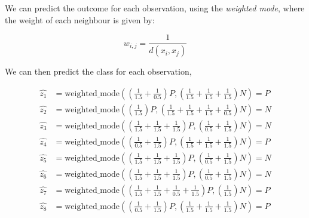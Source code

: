 \documentclass[12pt]{article}
\begin{document}
\begin{enumerate}[leftmargin=\labelsep]
          We can predict the outcome for each observation, using the \textit{weighted mode},
          where the weight of each neighbour is given by:

          $$
              w_{i,j} = \frac{1}{d(x_i, x_j)}
          $$

          We can then predict the class for each observation,

          \[
              \begin{aligned}
                  \hat{z_1} & = \text{weighted\_mode} \left(\left(\frac{1}{1.5}+\frac{1}{0.5}\right)P,\left(\frac{1}{1.5}+\frac{1}{1.5}+\frac{1}{1.5}\right)N\right) = P \\
                  \hat{z_2} & = \text{weighted\_mode} \left(\left(\frac{1}{1.5}\right)P,\left(\frac{1}{1.5}+\frac{1}{1.5}+\frac{1}{1.5}+\frac{1}{0.5}\right)N\right) = N \\
                  \hat{z_3} & = \text{weighted\_mode} \left(\left(\frac{1}{1.5}+\frac{1}{1.5}+\frac{1}{1.5}\right)P,\left(\frac{1}{0.5}+\frac{1}{1.5}\right)N\right) = N \\
                  \hat{z_4} & = \text{weighted\_mode} \left(\left(\frac{1}{0.5}+\frac{1}{1.5}\right)P,\left(\frac{1}{1.5}+\frac{1}{1.5}+\frac{1}{1.5}\right)N\right) = P \\
                  \hat{z_5} & = \text{weighted\_mode} \left(\left(\frac{1}{1.5}+\frac{1}{1.5}+\frac{1}{1.5}\right)P,\left(\frac{1}{0.5}+\frac{1}{1.5}\right)N\right) = N \\
                  \hat{z_6} & = \text{weighted\_mode} \left(\left(\frac{1}{1.5}+\frac{1}{1.5}+\frac{1}{1.5}\right)P,\left(\frac{1}{0.5}+\frac{1}{1.5}\right)N\right) = N \\
                  \hat{z_7} & = \text{weighted\_mode} \left(\left(\frac{1}{1.5}+\frac{1}{1.5}+\frac{1}{0.5}+\frac{1}{1.5}\right)P,\left(\frac{1}{1.5}\right)N\right) = P \\
                  \hat{z_8} & = \text{weighted\_mode} \left(\left(\frac{1}{0.5}+\frac{1}{1.5}\right)P,\left(\frac{1}{1.5}+\frac{1}{1.5}+\frac{1}{1.5}\right)N\right) = P
              \end{aligned}
          \]


\end{enumerate}
\end{document}
